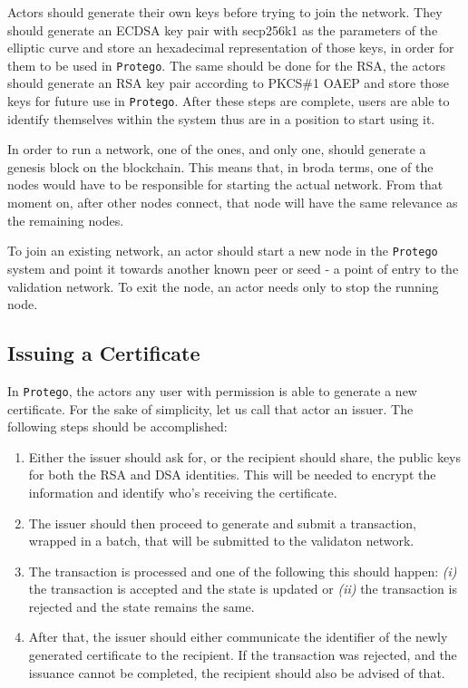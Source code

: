 Actors should generate their own keys before trying to join the network. They should generate an ECDSA key pair with secp256k1 as the parameters of the elliptic curve and store an hexadecimal representation of those keys, in order for them to be used in \texttt{Protego}. The same should be done for the RSA, the actors should generate an RSA key pair according to PKCS\#1 OAEP and store those keys for future use in \texttt{Protego}. After these steps are complete, users are able to identify themselves within the system thus are in a position to start using it.

In order to run a network, one of the ones, and only one, should generate a genesis block on the blockchain. This means that, in broda terms, one of the nodes would have to be responsible for starting the actual network. From that moment on, after other nodes connect, that node will have the same relevance as the remaining nodes.

To join an existing network, an actor should start a new node in the \texttt{Protego} system and point it towards another known peer or seed - a point of entry to the validation network. To exit the node, an actor needs only to stop the running node.

\subsection{Issuing a Certificate}

In \texttt{Protego}, the actors any user with permission is able to generate a new certificate. For the sake of simplicity, let us call that actor an issuer. The following steps should be accomplished:

\begin{enumerate}
	\item Either the issuer should ask for, or the recipient should share, the public keys for both the RSA and DSA identities. This will be needed to encrypt the information and identify who's receiving the certificate.
	\item The issuer should then proceed to generate and submit a transaction, wrapped in a batch, that will be submitted to the validaton network.
	\item The transaction is processed and one of the following this should happen: \emph{(i)} the transaction is accepted and the state is updated or \emph{(ii)} the transaction is rejected and the state remains the same.
	\item After that, the issuer should either communicate the identifier of the newly generated certificate to the recipient. If the transaction was rejected, and the issuance cannot be completed, the recipient should also be advised of that.
\end{enumerate}

